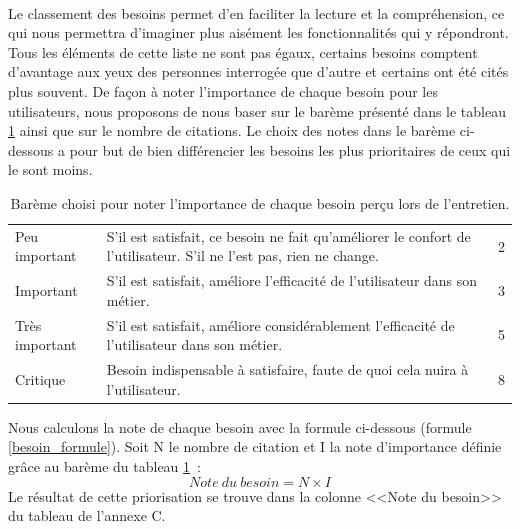 			\paragraph{}%
			Le classement des besoins permet d'en faciliter la lecture et la
			compréhension, ce qui nous permettra d'imaginer plus aisément les
			fonctionnalités qui y répondront. Tous les éléments de cette
			liste ne sont pas égaux, certains besoins comptent d'avantage aux yeux des
			personnes interrogée que d'autre et certains ont été cités plus
			souvent.\newline
			De façon à noter l'importance de chaque besoin pour les utilisateurs, nous
			proposons de nous baser sur le barème présenté dans le tableau
			\ref{bareme_besoins} ainsi que sur le nombre de citations. Le choix des notes
			dans le barème ci-dessous a pour but
			de bien différencier les besoins les plus prioritaires de ceux qui le sont moins.
			\begin{table}[H]
				\centering
				\caption{\label{bareme_besoins} Barème choisi pour noter l'importance de
				chaque besoin perçu lors de l'entretien.}
				\begin{tabular}{| p{4cm} | p{8cm} | p{2cm} |}
					\hline
						\thead{Priorité}
						&\thead{Description}
						&\thead{Note}
						\\
					\hline
						Peu important
						&
						S'il est satisfait, ce besoin ne fait qu'améliorer le confort de l'utilisateur. S'il ne l'est pas, rien ne change.
						&
						2
						\\
					\hline
						Important
						&
						S'il est satisfait, améliore l'efficacité de l'utilisateur dans son
						métier.
						&
						3
						\\
					\hline
						Très important
						&
						S'il est satisfait, améliore considérablement l'efficacité de
						l'utilisateur dans son métier.
						&
						5
						\\
					\hline
						Critique
						&
						Besoin indispensable à satisfaire, faute de quoi cela nuira à l'utilisateur.
						&
						8
						\\
					\hline
				\end{tabular}
			\end{table}
			Nous calculons la note de chaque besoin avec la formule ci-dessous
			(formule \ref{besoin_formule}).
			Soit N le nombre de citation et I la note d'importance définie grâce au
			barème du tableau \ref{bareme_besoins}~:
			\begin{equation}
				\label{besoin_formule}
				Note\ du\ besoin=N\times I
			\end{equation}
			Le résultat de cette priorisation se trouve dans la colonne <<Note du besoin>>
			du tableau de l'annexe C.
	
